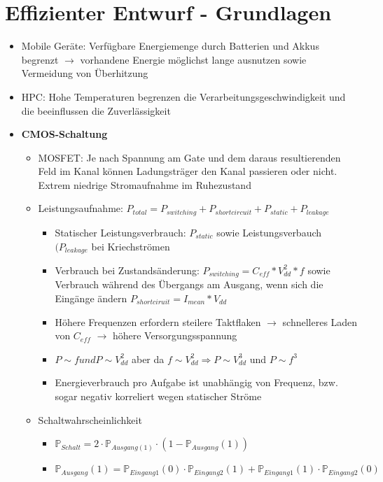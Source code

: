 \section{Effizienter Entwurf - Grundlagen}
\begin{itemize}
	\item Mobile Geräte: Verfügbare Energiemenge durch Batterien und Akkus begrenzt \(\rightarrow\) vorhandene Energie möglichst lange ausnutzen sowie Vermeidung von Überhitzung
	\item HPC: Hohe Temperaturen begrenzen die Verarbeitungsgeschwindigkeit und die beeinflussen die Zuverlässigkeit
	\item \textbf{CMOS-Schaltung}
	\begin{itemize}
		\item MOSFET: Je nach Spannung am Gate und dem daraus resultierenden Feld im Kanal können Ladungsträger den Kanal passieren oder nicht. Extrem niedrige Stromaufnahme im Ruhezustand
		\item Leistungsaufnahme: \(P_{total} = P_{switching} + P_{shortcircuit} + P_{static} + P_{leakage}\)
		\begin{itemize}
			\item Statischer Leistungsverbrauch: \(P_{static}\) sowie Leistungsverbauch $(P_{leakage}$ bei Kriechströmen
			\item Verbrauch bei Zustandsänderung: \(P_{switching}=C_{eff}*V_{dd}^2*f\) sowie Verbrauch während des Übergangs am Ausgang, wenn sich die Eingänge ändern \(P_{shortciruit}=I_{mean}*V_{dd}\) 
			\item Höhere Frequenzen erfordern steilere Taktflaken \(\rightarrow\) schnelleres Laden von \(C_{eff}\) \(\rightarrow\) höhere Versorgungsspannung 
			\item \(P \sim f und P \sim V_{dd}^2\) aber da $f \sim V_{dd}^2 \Rightarrow P \sim V_{dd}^3 $ und $P \sim f^3$
			\item Energieverbrauch pro Aufgabe ist unabhängig von Frequenz, bzw. sogar negativ korreliert wegen statischer Ströme		
		\end{itemize}
		\item Schaltwahrscheinlichkeit

		\begin{itemize}
			\item \(\mathbb{P}_{Schalt} = 2 \cdot \mathbb{P}_{Ausgang(1)} \cdot (1-\mathbb{P}_{Ausgang}(1))\)
			\item \(\mathbb{P}_{Ausgang}(1) = \mathbb{P}_{Eingang1}(0) \cdot \mathbb{P}_{Eingang2}(1) + \mathbb{P}_{Eingang1}(1) \cdot \mathbb{P}_{Eingang2}(0)\)
		\end{itemize}
	\end{itemize}
\end{itemize}

